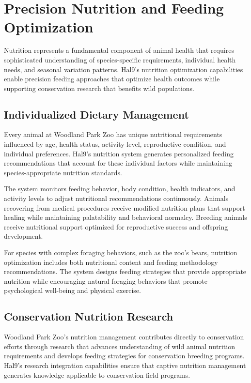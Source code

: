 \documentclass[
  Letterpaper,
]{scrbook}
\begin{document}
\section{Precision Nutrition and Feeding
Optimization}\label{precision-nutrition-and-feeding-optimization}

Nutrition represents a fundamental component of animal health that
requires sophisticated understanding of species-specific requirements,
individual health needs, and seasonal variation patterns. Hal9's
nutrition optimization capabilities enable precision feeding approaches
that optimize health outcomes while supporting conservation research
that benefits wild populations.

\subsection{Individualized Dietary
Management}\label{individualized-dietary-management}

Every animal at Woodland Park Zoo has unique nutritional requirements
influenced by age, health status, activity level, reproductive
condition, and individual preferences. Hal9's nutrition system generates
personalized feeding recommendations that account for these individual
factors while maintaining species-appropriate nutrition standards.

The system monitors feeding behavior, body condition, health indicators,
and activity levels to adjust nutritional recommendations continuously.
Animals recovering from medical procedures receive modified nutrition
plans that support healing while maintaining palatability and behavioral
normalcy. Breeding animals receive nutritional support optimized for
reproductive success and offspring development.

For species with complex foraging behaviors, such as the zoo's bears,
nutrition optimization includes both nutritional content and feeding
methodology recommendations. The system designs feeding strategies that
provide appropriate nutrition while encouraging natural foraging
behaviors that promote psychological well-being and physical exercise.

\subsection{Conservation Nutrition
Research}\label{conservation-nutrition-research}

Woodland Park Zoo's nutrition management contributes directly to
conservation efforts through research that advances understanding of
wild animal nutrition requirements and develops feeding strategies for
conservation breeding programs. Hal9's research integration capabilities
ensure that captive nutrition management generates knowledge applicable
to conservation field programs.
\end{document}

